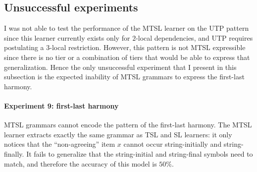 \subsection{Unsuccessful experiments}

I was not able to test the performance of the MTSL learner on the UTP pattern since this learner currently exists only for $2$-local dependencies, and UTP requires postulating a $3$-local restriction.
However, this pattern is not MTSL expressible since there is no tier or a combination of tiers that would be able to express that generalization.
Hence the only unsuccessful experiment that I present in this subsection is the expected inability of MTSL grammars to express the first-last harmony.


\paragraph{Experiment 9: first-last harmony}

MTSL grammars cannot encode the pattern of the first-last harmony.
The MTSL learner extracts exactly the same grammar as TSL and SL learners: it only notices that the ``non-agreeing'' item $x$ cannot occur string-initially and string-finally.
It fails to generalize that the string-initial and string-final symbols need to match, and therefore the accuracy of this model is $50$\%.

\begin{table}[h!]
\centering
{}
\caption{MTSL learning of first-last harmony; abstract representation.}
\end{table}


